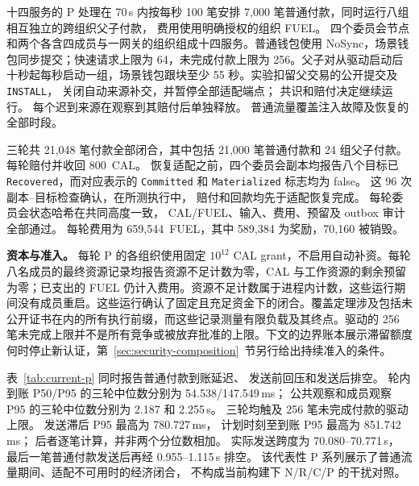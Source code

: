 十四服务的 P 处理在 70\,s 内按每秒 100 笔安排
7,000 笔普通付款，同时运行八组相互独立的跨组织父子付款，
费用使用明确授权的组织 FUEL。
四个委员会节点和两个各含四成员与一网关的组织组成十四服务。普通钱包使用 NoSync，场景钱包同步提交；快速请求上限为 64，未完成付款上限为 256。父子对从驱动启动后十秒起每秒启动一组，场景钱包跟块至少 55 秒。实验扣留父交易的公开提交及 \texttt{INSTALL}，
关闭自动来源补交，并暂停全部适配端点；
共识和赔付决定继续运行。
每个迟到来源在观察到其赔付后单独释放。
普通流量覆盖注入故障及恢复的全部时段。

三轮共 21,048 笔付款全部闭合，其中包括
21,000 笔普通付款和 24 组父子付款。
每轮赔付并收回 800~CAL。
恢复适配之前，四个委员会副本均报告八个目标已
\texttt{Recovered}，而对应表示的
\texttt{Committed} 和 \texttt{Materialized} 标志均为 false。
这 96 次副本--目标检查确认，在所测执行中，
赔付和回款均先于适配恢复完成。
每轮委员会状态哈希在共同高度一致，
CAL/FUEL、输入、费用、预留及 outbox 审计全部通过。
每轮费用为 659,544~FUEL，其中
589,384 为奖励，70,160 被销毁。

\noindent\textbf{资本与准入。}
每轮 P 的各组织使用固定 $10^{12}$ CAL grant，不启用自动补资。每轮八名成员的最终资源记录均报告资源不足计数为零，CAL 与工作资源的剩余预留为零；已支出的 FUEL 仍计入费用。资源不足计数属于进程内计数，这些运行期间没有成员重启。这些运行确认了固定且充足资金下的闭合。覆盖定理涉及包括未公开证书在内的所有执行前缀，而这些记录测量有限负载及其终点。驱动的 256 笔未完成上限并不是所有竞争或被放弃批准的上限。下文的边界账本展示滞留额度何时停止新认证，第~\ref{sec:security-composition}~节另行给出持续准入的条件。

表~\ref{tab:current-p} 同时报告普通付款到账延迟、
发送前回压和发送后排空。
轮内到账 P50/P95 的三轮中位数分别为
54.538/147.549\,ms；
公共观察和成员观察 P95 的三轮中位数分别为
2.187 和 2.255\,s。
三轮均触及 256 笔未完成付款的驱动上限。
发送滞后 P95 最高为 780.727\,ms，
计划时刻至到账 P95 最高为 851.742\,ms；
后者逐笔计算，并非两个分位数相加。
实际发送跨度为 70.080--70.771\,s，
最后一笔普通付款发送后再经 0.955--1.115\,s 排空。
该代表性 P 系列展示了普通流量期间、适配不可用时的经济闭合，
不构成当前构建下 N/R/C/P 的干扰对照。

